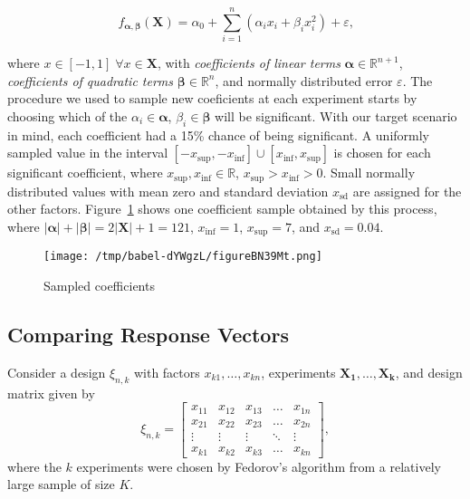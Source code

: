 \documentclass[11pt]{article}
\begin{document}
\[
f_{\boldsymbol{\alpha},\boldsymbol{\beta}}(\mathbf{X}) = \alpha_0 + \sum\limits^{n}_{i = 1}{\left(\alpha_{i}x_{i} + \beta_{i}x_{i}^{2}\right)} + \varepsilon\text{,}
\]

where \(x \in [-1, 1] \; \forall x \in \mathbf{X}\), with \emph{coefficients of linear
terms} \(\boldsymbol{\alpha} \in \mathbb{R}^{n + 1}\), \emph{coefficients of quadratic
terms} \(\boldsymbol{\beta} \in \mathbb{R}^{n}\), and normally distributed error
\(\varepsilon\). The procedure we used to sample new coeficients at each
experiment starts by choosing which of the \(\alpha_i \in \boldsymbol{\alpha}\),
\(\beta_i \in \boldsymbol{\beta}\) will be significant. With our target scenario
in mind, each coefficient had a 15\% chance of being significant. A uniformly
sampled value in the interval \([-x_{\text{sup}}, -x_{\text{inf}}] \cup
[x_{\text{inf}}, x_{\text{sup}}]\) is chosen for each significant coefficient,
where \(x_{\text{sup}},x_{\text{inf}} \in \mathbb{R}\),
\(x_{\text{sup}}>x_{\text{inf}}>0\). Small normally distributed values with mean
zero and standard deviation \(x_{\text{sd}}\) are assigned for the other factors.
Figure~\ref{fig:org12a0076} shows one coefficient sample obtained by this
process, where \(|\boldsymbol{\alpha}| + |\boldsymbol{\beta}| =
2|\boldsymbol{X}| + 1 = 121\), \(x_{\text{inf}} = 1\), \(x_{\text{sup}} = 7\), and
\(x_{\text{sd}} = 0.04\).

\begin{figure}[htbp]
\centering
\texttt{[image: /tmp/babel-dYWgzL/figureBN39Mt.png]}
\caption{\label{fig:org12a0076}
Sampled coefficients}
\end{figure}

\subsection{Comparing Response Vectors}
\label{sec:org2bd0b8f}
Consider a design \(\xi_{n,k}\) with factors \(x_{k1},\dots,x_{kn}\), experiments
\(\boldsymbol{X_1}, \dots, \boldsymbol{X_k}\), and design matrix given by
\[
\xi_{n,k} =
\begin{bmatrix}
    x_{11} & x_{12} & x_{13} & \dots  & x_{1n} \\
    x_{21} & x_{22} & x_{23} & \dots  & x_{2n} \\
    \vdots & \vdots & \vdots & \ddots & \vdots \\
    x_{k1} & x_{k2} & x_{k3} & \dots  & x_{kn}
\end{bmatrix},
\]
where the \(k\) experiments were chosen by Fedorov's algorithm from a relatively
large sample of size \(K\).
\end{document}
